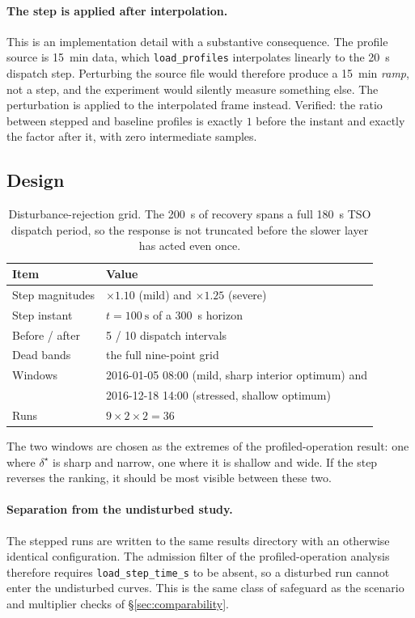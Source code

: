 \documentclass[11pt,a4paper]{article}
\newcommand{\dz}{\ensuremath{\delta}}
\begin{document}
\paragraph{The step is applied after interpolation.} This is an implementation
detail with a substantive consequence. The profile source is
\SI{15}{\minute} data, which \texttt{load\_profiles} interpolates linearly to
the \SI{20}{\second} dispatch step. Perturbing the source file would therefore
produce a \SI{15}{\minute} \emph{ramp}, not a step, and the experiment would
silently measure something else. The perturbation is applied to the interpolated
frame instead. Verified: the ratio between stepped and baseline profiles is
exactly $1$ before the instant and exactly the factor after it, with zero
intermediate samples.

\subsection{Design}

\begin{table}[htbp]
\centering
\begin{tabular}{ll}
\toprule
Item & Value \\
\midrule
Step magnitudes & $\times 1.10$ (mild) and $\times 1.25$ (severe) \\
Step instant & $t = \SI{100}{\second}$ of a \SI{300}{\second} horizon \\
Before / after & 5 / 10 dispatch intervals \\
Dead bands & the full nine-point grid \\
Windows & 2016-01-05 08:00 (mild, sharp interior optimum) and \\
        & 2016-12-18 14:00 (stressed, shallow optimum) \\
Runs & $9 \times 2 \times 2 = 36$ \\
\bottomrule
\end{tabular}
\caption{Disturbance-rejection grid. The \SI{200}{\second} of recovery spans a
full \SI{180}{\second} TSO dispatch period, so the response is not truncated
before the slower layer has acted even once.}
\label{tab:steptable}
\end{table}

The two windows are chosen as the extremes of the profiled-operation result: one
where $\dz^\star$ is sharp and narrow, one where it is shallow and wide. If the
step reverses the ranking, it should be most visible between these two.

\paragraph{Separation from the undisturbed study.} The stepped runs are written
to the same results directory with an otherwise identical configuration. The
admission filter of the profiled-operation analysis therefore requires
\texttt{load\_step\_time\_s} to be absent, so a disturbed run cannot enter the
undisturbed curves. This is the same class of safeguard as the scenario and
multiplier checks of \S\ref{sec:comparability}.
\end{document}
